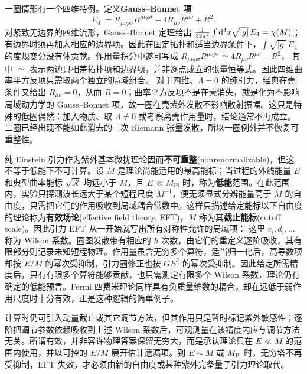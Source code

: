 一圈情形有一个四维特例。定义\textbf{Gauss--Bonnet 项}
\[
    E_4:=R_{\mu\nu\rho\sigma}R^{\mu\nu\rho\sigma}
    -4R_{\mu\nu}R^{\mu\nu}+R^2.
\]
对紧致无边界的四维流形，Gauss--Bonnet 定理给出 $\frac{1}{32\pi^2}\int\dd^4x\sqrt{\lvert g\rvert}\,E_4=\chi(M)$；有边界时须再加入相应的边界项。因此在固定拓扑和适当边界条件下，$\int\sqrt{\lvert g\rvert}\,E_4$ 的度规变分没有体贡献。作用量积分中遂可写成
$R_{\mu\nu\rho\sigma}R^{\mu\nu\rho\sigma}\simeq4R_{\mu\nu}R^{\mu\nu}-R^2$，
其中 $\simeq$ 表示两边只相差拓扑项和边界项，并非逐点成立的张量恒等式。因此四维曲率平方反项只需取两个独立的局域组合。
对于四维、$\Lambda=0$ 的纯引力，经典在壳条件又给出 $R_{\mu\nu}=0$，从而 $R=0$；曲率平方反项不是在壳消失，就是化为不影响局域动力学的 Gauss--Bonnet 项，故一圈在壳紫外发散不影响散射振幅。这只是特殊的低圈偶然：加入物质、取 $\Lambda\neq0$ 或考察离壳作用量时，结论通常不再成立。二圈已经出现不能如此消去的三次 Riemann 张量发散，所以一圈例外并不恢复可重整性。

纯 Einstein 引力作为紫外基本微扰理论因而\textbf{不可重整}(nonrenormalizable)，但这不等于低能下不可计算。设 $M$ 是理论尚能适用的最高能标；当过程的外线能量 $E$ 和典型曲率能标 $\sqrt{\mathcal R}$ 均远小于 $M$，且 $E\ll M_{\mathrm{Pl}}$ 时，称为\textbf{低能}范围。在此范围内，实验只探测波长远大于某个短程尺度 $M^{-1}$，便无须显式分辨能量高于 $M$ 的自由度，只需把它们的作用吸收到局域耦合常数中。这样只描述给定能标以下自由度的理论称为\textbf{有效场论}(effective field theory, EFT)，$M$ 称为其\textbf{截止能标}(cutoff scale)。因此引力 EFT 从一开始就写出所有对称性允许的局域项：
这里 $c_i,d_i,\ldots$ 称为 Wilson 系数。圈图发散带有相应的 $\hbar$ 次数，由它们的重定义逐阶吸收，其有限部分则记录未知短程物理。作用量虽含无穷多个算符，适当归一化后，高导数项却按 $E/M$ 的幂次受抑制，引力圈修正也按 $GE^2$ 的幂次受抑制。因此给定所需精度后，只有有限多个算符能够贡献，也只需测定有限多个 Wilson 系数，理论仍有确定的低能预言。Fermi 四费米理论同样具有负质量维数的耦合，却在远低于弱作用尺度时十分有效，正是这种逻辑的简单例子。

计算时仍可引入动量截止或其它调节方法，但其作用只是暂时标记紫外敏感性；逐阶把调节参数依赖吸收到上述 Wilson 系数后，可观测量在该精度内应与调节方法无关。所谓有效，并非容许物理答案保留无穷大，而是承认理论只在 $E\ll M$ 的范围内使用，并以可控的 $E/M$ 展开估计遗漏项。到 $E\sim M$ 或 $M_{\mathrm{Pl}}$ 时，无穷塔不再受抑制，EFT 失效，才必须由新的自由度或某种紫外完备量子引力理论取代。

